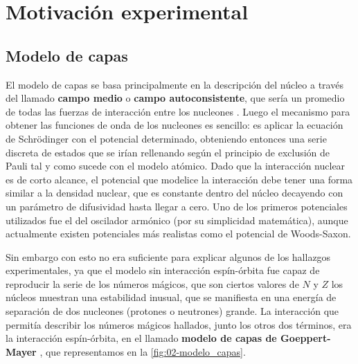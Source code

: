 \section{Motivación experimental}



\subsection{Modelo de capas}


El modelo de capas se basa principalmente en la descripción del núcleo a través del llamado \textbf{campo medio} o \textbf{campo autoconsistente}, que sería un promedio de todas las fuerzas de interacción entre los nucleones \cite{Pahlavani15}.  Luego el mecanismo para obtener las funciones de onda de los nucleones es sencillo: es aplicar la ecuación de Schrödinger con el potencial determinado, obteniendo entonces una serie discreta de estados que se irían rellenando según el principio de exclusión de Pauli tal y como sucede con el modelo atómico. Dado que la interacción nuclear es de corto alcance, el potencial que modelice la interacción debe tener una forma similar a la densidad nuclear, que es constante dentro del núcleo decayendo con un parámetro de difusividad hasta llegar a cero. Uno de los primeros potenciales utilizados fue el del oscilador armónico (por su simplicidad matemática), aunque actualmente existen potenciales más realistas como el potencial de Woods-Saxon.

Sin embargo con esto no era suficiente para explicar algunos de los hallazgos experimentales, ya que el modelo sin interacción espín-órbita fue capaz de reproducir la serie de los números mágicos, que son ciertos valores de $N$ y $Z$ los núcleos muestran una estabilidad inusual, que se manifiesta en una energía de separación de dos nucleones (protones o neutrones) grande. La interacción que permitía describir los números mágicos hallados, junto los otros dos términos, era la interacción espín-órbita, en el llamado \textbf{modelo de capas de Goeppert-Mayer} \cite{GoepertMayer}, que representamos en la \cref{fig:02-modelo_capas}. 


